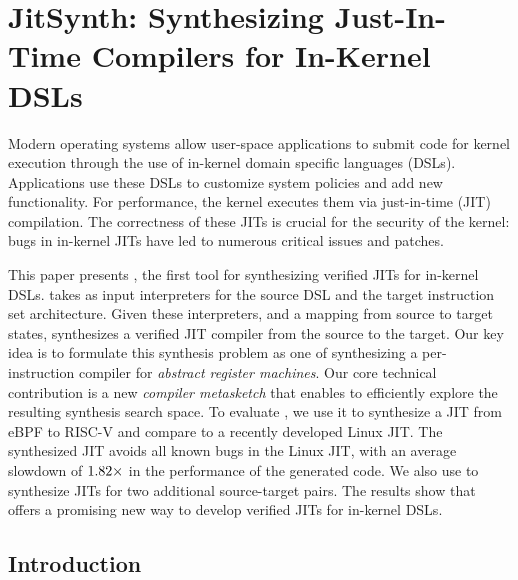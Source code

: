 \chapter{JitSynth: Synthesizing Just-In-Time Compilers for In-Kernel DSLs}
\label{c:jitsynth}
% 


Modern operating systems allow user-space applications to submit code for kernel
execution through the use of in-kernel domain specific languages (DSLs).
Applications use these DSLs to customize system policies and add new
functionality. For performance, the kernel executes them via just-in-time (JIT)
compilation. The correctness of these JITs is crucial for the security of the
kernel: bugs in in-kernel JITs have led to numerous critical issues and
patches.\tighten

\smallskip
This paper presents \jitsynth, the first tool for synthesizing verified JITs for
in-kernel DSLs. \jitsynth takes as input interpreters for the source DSL and the
target instruction set architecture. Given these interpreters, and a mapping
from source to target states, \jitsynth synthesizes a verified JIT compiler from
the source to the target. Our key idea is to formulate this synthesis problem as
one of synthesizing a per-instruction compiler for \emph{abstract register
machines}. Our core technical contribution is a new \emph{compiler metasketch}
that enables \jitsynth to efficiently explore the resulting synthesis search
space. To evaluate \jitsynth, we use it to synthesize a JIT from eBPF to RISC-V
and compare to a recently developed Linux JIT\@. The synthesized JIT avoids all
known bugs in the Linux JIT, with an average slowdown of
$1.82\times$ in the performance of the generated code. We also
use \jitsynth to synthesize JITs for two additional source-target
pairs.  The results show that \jitsynth offers a promising new way
to develop verified JITs for in-kernel DSLs.\tighten


\section{Introduction}
















%
%

% 
